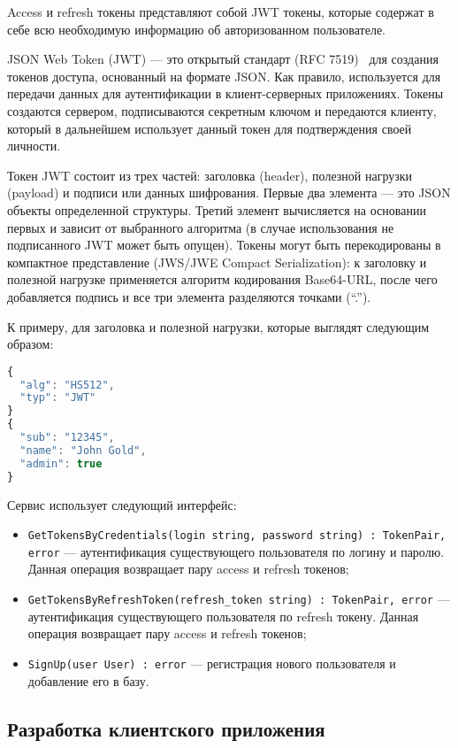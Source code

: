 Access и refresh токены представляют собой JWT токены, которые содержат в себе всю необходимую информацию об авторизованном пользователе.

JSON Web Token (JWT) — это открытый стандарт (RFC 7519)~\cite{jwt} для создания токенов доступа, основанный на формате JSON. Как правило, используется для передачи данных для аутентификации в клиент-серверных приложениях. Токены создаются сервером, подписываются секретным ключом и передаются клиенту, который в дальнейшем использует данный токен для подтверждения своей личности.

Токен JWT состоит из трех частей: заголовка (header), полезной нагрузки (payload) и подписи или данных шифрования. Первые два элемента — это JSON объекты определенной структуры. Третий элемент вычисляется на основании первых и зависит от выбранного алгоритма (в случае использования не подписанного JWT может быть опущен). Токены могут быть перекодированы в компактное представление (JWS/JWE Compact Serialization): к заголовку и полезной нагрузке применяется алгоритм кодирования Base64-URL, после чего добавляется подпись и все три элемента разделяются точками (``.'').

К примеру, для заголовка и полезной нагрузки, которые выглядят следующим образом:

\begin{lstlisting}[language=javascript]
{
  "alg": "HS512",
  "typ": "JWT"
}
{
  "sub": "12345",
  "name": "John Gold",
  "admin": true
}
\end{lstlisting}

Сервис использует следующий интерфейс:

\begin{itemize}
    \item \lstinline{GetTokensByCredentials(login string, password string) : TokenPair, error} — аутентификация существующего пользователя по логину и паролю. Данная операция возвращает пару access и refresh токенов;
    \item \lstinline{GetTokensByRefreshToken(refresh_token string) : TokenPair, error} — аутентификация существующего пользователя по refresh токену. Данная операция возвращает пару access и refresh токенов;
    \item \lstinline{SignUp(user User) : error} — регистрация нового пользователя и добавление его в базу.
\end{itemize}

\subsection{Разработка клиентского приложения}\label{sec:development:client_app}

